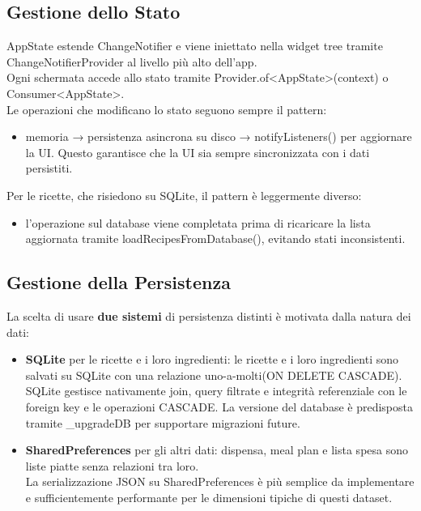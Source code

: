 \documentclass[a4paper, 12pt]{article}
\begin{document}
\newpage

\subsection{Gestione dello Stato}
AppState estende ChangeNotifier e viene iniettato nella widget tree tramite ChangeNotifierProvider al livello più alto dell’app.\\
Ogni schermata accede allo stato tramite Provider.of<AppState>(context) o Consumer<AppState>.\\

\vspace{0.5 cm}
Le operazioni che modificano lo stato seguono sempre il pattern:
\begin{itemize}[nosep]
    \item[] memoria → persistenza asincrona su disco → notifyListeners() per aggiornare la UI. Questo garantisce che la UI sia sempre sincronizzata con i dati persistiti.
\end{itemize}

\vspace{0.5 cm}
Per le ricette, che risiedono su SQLite, il pattern è leggermente diverso:
\begin{itemize}[nosep]
    \item[] l’operazione sul database viene completata prima di ricaricare la lista aggiornata tramite loadRecipesFromDatabase(), evitando stati inconsistenti.
\end{itemize}

\subsection{Gestione della Persistenza}
La scelta di usare \textbf{due sistemi} di persistenza distinti è motivata dalla natura dei dati:
\begin{itemize}
    \item \textbf{SQLite} per le ricette e i loro ingredienti: le ricette e i loro ingredienti sono salvati su SQLite con una relazione uno-a-molti(ON DELETE CASCADE).\\
    SQLite gestisce nativamente join, query filtrate e integrità referenziale con le foreign key e le operazioni CASCADE. La versione del database è predisposta tramite \_upgradeDB per supportare migrazioni future.
    \item \textbf{SharedPreferences} per gli altri dati: dispensa, meal plan e lista spesa sono liste piatte senza relazioni tra loro. \\
    La serializzazione JSON su SharedPreferences è più semplice da implementare e sufficientemente performante per le dimensioni tipiche di questi dataset.
\end{itemize}
\end{document}
